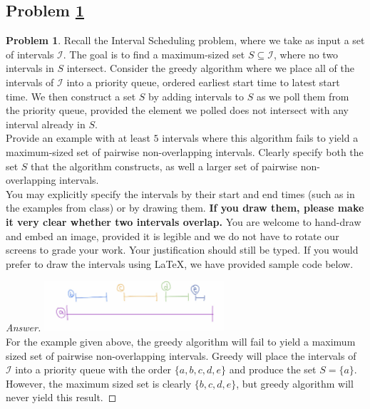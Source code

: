 \documentclass[11pt]{article}
\theoremstyle{definition}
\theoremstyle{definition}
\newtheorem{required}{Problem}
\theoremstyle{definition}
\newcommand{\interval}[4]{\draw (#2, #1) -- (#3, #1); %
\draw (#2, #1-0.11) -- (#2, #1+0.11); %
\draw (#3, #1-0.11) -- (#3, #1+0.11); %
\node[] at (#2-0.25, #1) {#4};
}
\begin{document}
\subsection{Problem \ref{GreedyFail1}}
\begin{required} \label{GreedyFail1}
Recall the \textsf{Interval Scheduling} problem, where we take as input a set of intervals $\mathcal{I}$. The goal is to find a maximum-sized set $S \subseteq \mathcal{I}$, where no two intervals in $S$ intersect. Consider the greedy algorithm where we place all of the intervals of $\mathcal{I}$ into a priority queue, ordered earliest start time to latest start time. We then construct a set $S$ by adding intervals to $S$ as we poll them from the priority queue, provided the element we polled does not intersect with any interval already in $S$. \\

\noindent Provide an example with at least $5$ intervals where this algorithm fails to yield a maximum-sized set of pairwise non-overlapping intervals. Clearly specify both the set $S$ that the algorithm constructs, as well a larger set of pairwise non-overlapping intervals. \\

\noindent You may explicitly specify the intervals by their start and end times (such as in the examples from class) or by drawing them. \textbf{If you draw them, please make it very clear whether two intervals overlap.} You are welcome to hand-draw and embed an image, provided it is legible and we do not have to rotate our screens to grade your work. Your justification should still be typed. If you would prefer to draw the intervals using \LaTeX, we have provided sample code below.
\end{required}



\begin{proof}[Answer]

\includegraphics[width=0.5\textwidth]{problem5} \\
For the example given above, the greedy algorithm will fail to yield a maximum sized set of pairwise non-overlapping intervals. Greedy will place the intervals of $\mathcal{I}$ into a priority queue with the order $\{a, b, c, d, e\}$ and produce the set $S=\{a\}$. However, the maximum sized set is clearly $\{b, c, d, e\}$, but greedy algorithm will never yield this result.

\end{proof}
\end{document}
